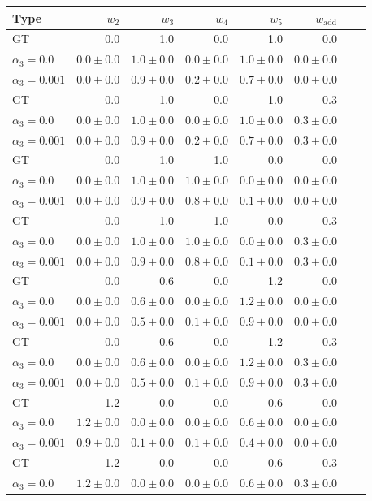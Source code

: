 \documentclass{article}
\theoremstyle{plain}
\theoremstyle{definition}
\theoremstyle{remark}
\begin{document}
\begin{table}[htb!]
\centering
\small
\begin{tabular}{lrrrrrrr}
\toprule
Type&$w_2$&$w_3$&$w_4$&$w_5$&$w_\text{add}$ \\ 
\midrule
GT&0.0&1.0&0.0&1.0&0.0\\
$\alpha_3=0.0$&$0.0\pm0.0$&$1.0\pm0.0$&$0.0\pm0.0$&$1.0\pm0.0$&$0.0\pm0.0$&\\
$\alpha_3=0.001$&$0.0\pm0.0$&$0.9\pm0.0$&$0.2\pm0.0$&$0.7\pm0.0$&$0.0\pm0.0$&\\
\midrule
GT&0.0&1.0&0.0&1.0&0.3\\
$\alpha_3=0.0$&$0.0\pm0.0$&$1.0\pm0.0$&$0.0\pm0.0$&$1.0\pm0.0$&$0.3\pm0.0$&\\
$\alpha_3=0.001$&$0.0\pm0.0$&$0.9\pm0.0$&$0.2\pm0.0$&$0.7\pm0.0$&$0.3\pm0.0$&\\
\midrule
GT&0.0&1.0&1.0&0.0&0.0\\
$\alpha_3=0.0$&$0.0\pm0.0$&$1.0\pm0.0$&$1.0\pm0.0$&$0.0\pm0.0$&$0.0\pm0.0$&\\
$\alpha_3=0.001$&$0.0\pm0.0$&$0.9\pm0.0$&$0.8\pm0.0$&$0.1\pm0.0$&$0.0\pm0.0$&\\
\midrule
GT&0.0&1.0&1.0&0.0&0.3\\
$\alpha_3=0.0$&$0.0\pm0.0$&$1.0\pm0.0$&$1.0\pm0.0$&$0.0\pm0.0$&$0.3\pm0.0$&\\
$\alpha_3=0.001$&$0.0\pm0.0$&$0.9\pm0.0$&$0.8\pm0.0$&$0.1\pm0.0$&$0.3\pm0.0$&\\
\midrule
GT&0.0&0.6&0.0&1.2&0.0\\
$\alpha_3=0.0$&$0.0\pm0.0$&$0.6\pm0.0$&$0.0\pm0.0$&$1.2\pm0.0$&$0.0\pm0.0$&\\
$\alpha_3=0.001$&$0.0\pm0.0$&$0.5\pm0.0$&$0.1\pm0.0$&$0.9\pm0.0$&$0.0\pm0.0$&\\
\midrule
GT&0.0&0.6&0.0&1.2&0.3\\
$\alpha_3=0.0$&$0.0\pm0.0$&$0.6\pm0.0$&$0.0\pm0.0$&$1.2\pm0.0$&$0.3\pm0.0$&\\
$\alpha_3=0.001$&$0.0\pm0.0$&$0.5\pm0.0$&$0.1\pm0.0$&$0.9\pm0.0$&$0.3\pm0.0$&\\
\midrule
GT&1.2&0.0&0.0&0.6&0.0\\
$\alpha_3=0.0$&$1.2\pm0.0$&$0.0\pm0.0$&$0.0\pm0.0$&$0.6\pm0.0$&$0.0\pm0.0$&\\
$\alpha_3=0.001$&$0.9\pm0.0$&$0.1\pm0.0$&$0.1\pm0.0$&$0.4\pm0.0$&$0.0\pm0.0$&\\
\midrule
GT&1.2&0.0&0.0&0.6&0.3\\
$\alpha_3=0.0$&$1.2\pm0.0$&$0.0\pm0.0$&$0.0\pm0.0$&$0.6\pm0.0$&$0.3\pm0.0$&\\

\end{tabular}
\end{table}
\end{document}
